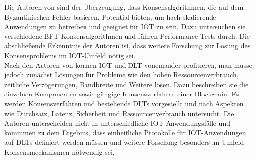 Die Autoren von \cite{Eval2018} sind der Überzeugung, dass Konsensalgorithmen, die auf dem Byzantinischen Fehler basieren, Potential bieten, um hoch-skalierende Anwendungen zu betreiben und geeignet für \ac{IOT} zu sein. Dazu untersuchen sie verschiedene \ac{BFT} Konsensalgorithmen und führen Performance-Tests durch. Die abschließende Erkenntnis der Autoren ist, dass weitere Forschung zur Lösung des Konsensproblems im \ac{IOT}-Umfeld nötig sei.\\
Nach den Autoren von \cite{convergence2019} können \ac{IOT} und \ac{DLT} voneinander profitieren, man müsse jedoch zunächst Lösungen für Probleme wie den hohen Ressourcenverbrauch, zeitliche Verzögerungen, Bandbreite und Weitere lösen. Dazu beschreiben sie die einzelnen Komponenten sowie gängige Konsensverfahren einer Blockchain. Es werden Konsensverfahren und bestehende \ac{DLT}s vorgestellt und nach Aspekten wie Durchsatz, Latenz, Sicherheit und Ressourcenverbrauch untersucht. Die Autoren unterscheiden nicht in unterschiedliche \ac{IOT}-Anwendungsfälle und kommmen zu dem Ergebnis, dass
einheitliche Protokolle für \ac{IOT}-Anwendungen auf \ac{DLT}s definiert werden müssen und weitere Forschung besonders im Umfeld Konsensmechanismen nötwendig sei.

